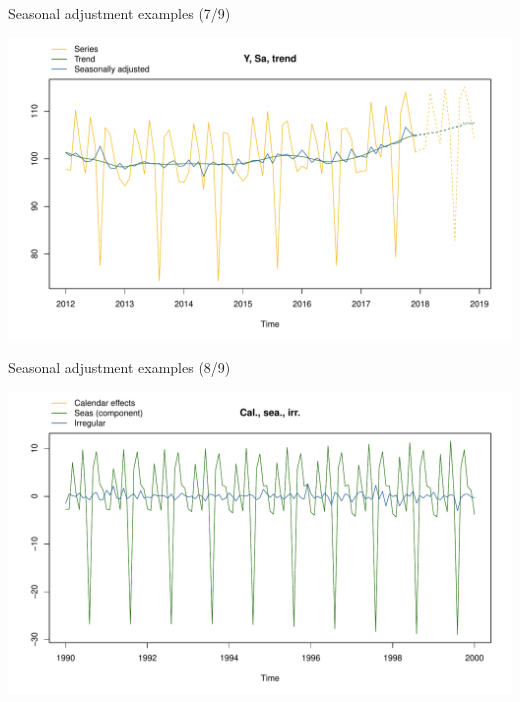 \documentclass[10pt,xcolor=table,color={dvipsnames,usenames},ignorenonframetext,usepdftitle=false,french]{beamer}
\newenvironment{Shaded}{\begin{snugshade}}{\end{snugshade}}
\newcommand{\DataTypeTok}[1]{\textcolor[rgb]{0.13,0.29,0.53}{#1}}
\newcommand{\DecValTok}[1]{\textcolor[rgb]{0.00,0.00,0.81}{#1}}
\newcommand{\KeywordTok}[1]{\textcolor[rgb]{0.13,0.29,0.53}{\textbf{#1}}}
\newcommand{\NormalTok}[1]{#1}
\newcommand{\OperatorTok}[1]{\textcolor[rgb]{0.81,0.36,0.00}{\textbf{#1}}}
\newcommand{\StringTok}[1]{\textcolor[rgb]{0.31,0.60,0.02}{#1}}
\begin{document}
\begin{frame}[fragile]{Seasonal adjustment examples (7/9)}
\protect\hypertarget{seasonal-adjustment-examples-79}{}

\begin{Shaded}
\end{Shaded}

\includegraphics{img/markdown-unnamed-chunk-10-1.pdf}

\end{frame}

\begin{frame}[fragile]{Seasonal adjustment examples (8/9)}
\protect\hypertarget{seasonal-adjustment-examples-89}{}

\begin{Shaded}
\end{Shaded}

\includegraphics{img/markdown-unnamed-chunk-11-1.pdf}

\end{frame}
\end{document}

